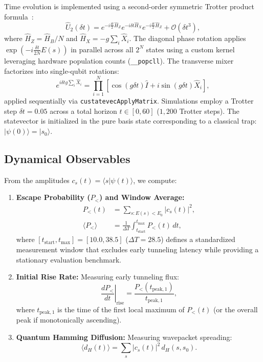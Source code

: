 \documentclass[10pt,twocolumn,a4paper]{article}
\begin{document}
Time evolution is implemented using a second-order symmetric Trotter product formula~\cite{trotter1959, suzuki1976, childs2021}:
\begin{equation}
    \hat{U}_2(\delta t) = e^{-i \frac{\delta t}{2} \hat{H}_Z} e^{-i \delta t \hat{H}_X} e^{-i \frac{\delta t}{2} \hat{H}_Z} + \mathcal{O}(\delta t^3),
\end{equation}
where $\hat{H}_Z = \hat{H}_B / N$ and $\hat{H}_X = -g \sum_i \hat{X}_i$. The diagonal phase rotation applies $\exp(-i \frac{\delta t}{2N} E(s))$ in parallel across all $2^N$ states using a custom kernel leveraging hardware population counts (\verb|__popcll|). The transverse mixer factorizes into single-qubit rotations:
\begin{equation}
    e^{i \delta t g \sum_i \hat{X}_i} = \prod_{i=1}^N \left[ \cos(g \delta t) \hat{I} + i \sin(g \delta t) \hat{X}_i \right],
\end{equation}
applied sequentially via \texttt{custatevecApplyMatrix}. Simulations employ a Trotter step $\delta t = 0.05$ across a total horizon $t \in [0, 60]$ ($1{,}200$ Trotter steps). The statevector is initialized in the pure basis state corresponding to a classical trap: $|\psi(0)\rangle = |s_0\rangle$.

\subsection{Dynamical Observables}
From the amplitudes $c_s(t) = \langle s | \psi(t) \rangle$, we compute:
\begin{enumerate}
    \item \textbf{Escape Probability ($P_<$) and Window Average:}
    \begin{align}
        P_<(t) &= \sum_{s : E(s) < E_0} |c_s(t)|^2, \\
        \langle P_< \rangle &= \frac{1}{\Delta T} \int_{t_{\mathrm{start}}}^{t_{\max}} P_<(t) \, dt,
    \end{align}
    where $[t_{\mathrm{start}}, t_{\max}] = [10.0, 38.5]$ ($\Delta T = 28.5$) defines a standardized measurement window that excludes early tunneling latency while providing a stationary evaluation benchmark.
    \item \textbf{Initial Rise Rate:} Measuring early tunneling flux:
    \begin{equation}
        \left. \frac{dP_<}{dt} \right|_{\mathrm{rise}} = \frac{P_<(t_{\mathrm{peak}, 1})}{t_{\mathrm{peak}, 1}},
    \end{equation}
    where $t_{\mathrm{peak}, 1}$ is the time of the first local maximum of $P_<(t)$ (or the overall peak if monotonically ascending).
    \item \textbf{Quantum Hamming Diffusion:} Measuring wavepacket spreading:
    \begin{equation}
        \langle d_H(t) \rangle = \sum_{s} |c_s(t)|^2 \, d_H(s, s_0).
    \end{equation}
\end{enumerate}
\end{document}
